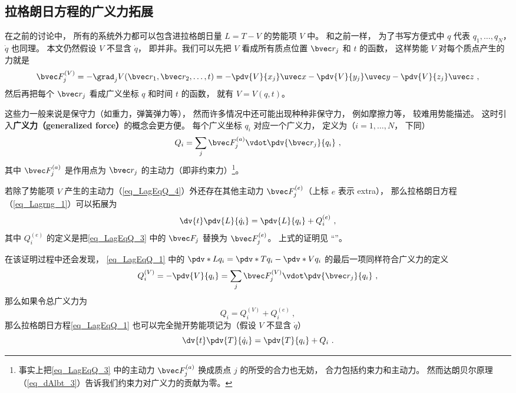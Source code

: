 

\subsection{拉格朗日方程的广义力拓展}
在之前的讨论中， 所有的系统外力都可以包含进拉格朗日量 $L = T-V$ 的势能项 $V$ 中。 和之前一样， 为了书写方便式中 $q$ 代表 $q_1, \dots, q_N$， $\dot q$ 也同理。 本文仍然假设 $V$ 不显含 $\dot q$， 即并非。我们可以先把 $V$ 看成所有质点位置 $\bvec r_j$ 和 $t$ 的函数， 这样势能 $V$ 对每个质点产生的力就是
\begin{equation}\label{eq_LagEqQ_4}
\bvec F_j^{(V)} = - \grad_j V(\bvec r_1,\bvec r_2,\dots,t) = -\pdv{V}{x_j}\uvec x - \pdv{V}{y_j}\uvec y - \pdv{V}{z_j} \uvec z~,
\end{equation}
然后再把每个 $\bvec r_j$ 看成广义坐标 $q$ 和时间 $t$ 的函数， 就有 $V = V(q,t)$。

这些力一般来说是保守力（如重力，弹簧弹力等）， 然而许多情况中还可能出现种种非保守力， 例如摩擦力等， 较难用势能描述。 这时引入\textbf{广义力（generalized force）}的概念会更方便。 每个广义坐标 $q_i$ 对应一个广义力， 定义为（$i=1,\dots,N$， 下同）
\begin{equation}\label{eq_LagEqQ_3}
Q_i = \sum_j \bvec F_j^{(a)} \vdot \pdv{\bvec r_j}{q_i}~,
\end{equation}
其中 $\bvec F_j^{(a)}$ 是作用点为 $\bvec r_j$ 的主动力（即非约束力）\footnote{事实上把\autoref{eq_LagEqQ_3} 中的主动力 $\bvec F_j^{(a)}$ 换成质点 $j$ 的所受的合力也无妨， 合力包括约束力和主动力。 然而达朗贝尔原理（\autoref{eq_dAlbt_3}）告诉我们约束力对广义力的贡献为零。}。

若除了势能项 $V$ 产生的主动力（\autoref{eq_LagEqQ_4}）外还存在其他主动力 $\bvec F_j^{(e)}$（上标 $e$ 表示 extra）， 那么拉格朗日方程（\autoref{eq_Lagrng_1}）可以拓展为
\begin{equation}\label{eq_LagEqQ_1}
\dv{t} \pdv{L}{\dot q_i} = \pdv{L}{q_i} + Q_i^{(e)}~,
\end{equation}
其中 $Q_i^{(e)}$ 的定义是把\autoref{eq_LagEqQ_3} 中的 $\bvec F_j$ 替换为 $\bvec F_j^{(e)}$。 上式的证明见 “”。

在该证明过程中还会发现， \autoref{eq_LagEqQ_1} 中的 $\pdv*{L}{q_i} = \pdv*{T}{q_i} - \pdv*{V}{q_i}$ 的最后一项同样符合广义力的定义
\begin{equation}
Q_i^{(V)} = -\pdv{V}{q_i} = \sum_j \bvec F_j^{(V)} \vdot \pdv{\bvec r_j}{q_i}~,
\end{equation}
那么如果令总广义力为
\begin{equation}
Q_i = Q_i^{(V)} + Q_i^{(e)}~,
\end{equation}
那么拉格朗日方程\autoref{eq_LagEqQ_1} 也可以完全抛开势能项记为（假设 $V$ 不显含 $\dot q$）
\begin{equation}\label{eq_LagEqQ_2}
\dv{t} \pdv{T}{\dot q_i} = \pdv{T}{q_i} + Q_i~.
\end{equation}

